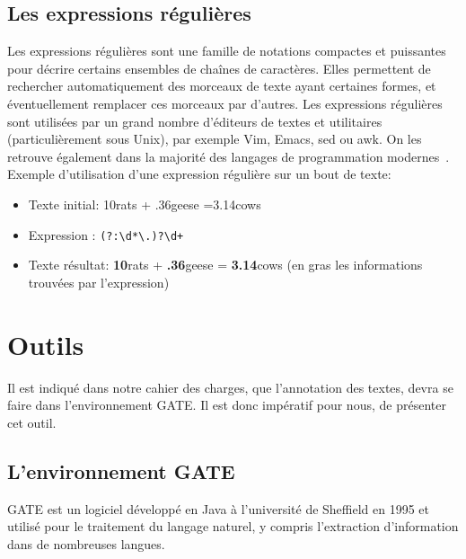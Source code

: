 \documentclass[a4paper, 11pt]{report}
\begin{document}
\subsection{Les expressions régulières}
Les expressions régulières sont une famille de notations compactes et puissantes pour décrire certains ensembles de chaînes de caractères. Elles permettent de rechercher automatiquement des morceaux de texte ayant certaines formes, et éventuellement remplacer ces morceaux par d'autres.
Les expressions régulières sont utilisées par un grand nombre d'éditeurs de textes et utilitaires (particulièrement sous Unix), par exemple Vim, Emacs, sed ou awk. On les retrouve également dans la majorité des langages de programmation modernes~\cite{w3reg}.\\
Exemple d'utilisation d'une expression régulière sur un bout de texte:
\begin{itemize}
\item Texte initial: 10rats + .36geese =3.14cows
\item Expression : \verb|(?:\d*\.)?\d+|
\item Texte résultat: \textbf{10}rats + \textbf{.36}geese = \textbf{3.14}cows (en gras les informations trouvées par l’expression)
\end{itemize}
\section{Outils}%
Il est indiqué dans notre cahier des charges, que l'annotation des textes, devra se faire dans l'environnement GATE. Il est donc impératif pour nous, de présenter cet outil.
\subsection{L'environnement GATE}
GATE est un logiciel développé en Java à l’université de Sheffield en 1995 et utilisé pour
le traitement du langage naturel, y compris l’extraction d’information dans de nombreuses
langues. 
\end{document}
